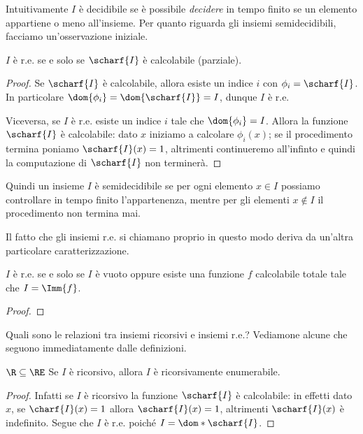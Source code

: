 Intuitivamente $I$ è decidibile se è possibile \emph{decidere} in tempo finito se un elemento appartiene o meno all'insieme. Per quanto riguarda gli insiemi semidecidibili, facciamo un'osservazione iniziale.

\begin{remark}
    $I$ è r.e. se e solo se $\scharf{I}$ è calcolabile (parziale).
    \begin{proof}
        Se $\scharf{I}$ è calcolabile, allora esiste un indice $i$ con $\phi_i = \scharf{I}$. In particolare $\dom{\phi_i} = \dom{\scharf{I}} = I$, dunque $I$ è r.e.
        
        Viceversa, se $I$ è r.e. esiste un indice $i$ tale che $\dom{\phi_i} = I$. Allora la funzione $\scharf{I}$ è calcolabile: dato $x$ iniziamo a calcolare $\phi_{i}(x)$; se il procedimento termina poniamo $\scharf{I}(x) = 1$, altrimenti continueremo all'infinto e quindi la computazione di $\scharf{I}$ non terminerà.   
    \end{proof} 
\end{remark}

Quindi un insieme $I$ è semidecidibile se per ogni elemento $x \in I$ possiamo controllare in tempo finito l'appartenenza, mentre per gli elementi $x \notin I$ il procedimento non termina mai.

Il fatto che gli insiemi r.e. si chiamano proprio in questo modo deriva da un'altra particolare caratterizzazione.

\begin{proposition}{}{}
    $I$ è r.e. se e solo se $I$ è vuoto oppure esiste una funzione $f$ calcolabile totale tale che $I = \Imm{f}$.  
\end{proposition}
\begin{proof}
\end{proof}

Quali sono le relazioni tra insiemi ricorsivi e insiemi r.e.? Vediamone alcune che seguono immediatamente dalle definizioni.

\begin{proposition}
    {$\R \subseteq \RE$}{}
    Se $I$ è ricorsivo, allora $I$ è ricorsivamente enumerabile.
\end{proposition}
\begin{proof}
    Infatti se $I$ è ricorsivo la funzione $\scharf{I}$ è calcolabile: in effetti dato $x$, se $\charf{I}(x) = 1$ allora $\scharf{I}(x) = 1$, altrimenti $\scharf{I}(x)$ è indefinito. 
    Segue che $I$ è r.e. poiché $I = \dom*{\scharf{I}}$. 
\end{proof}

